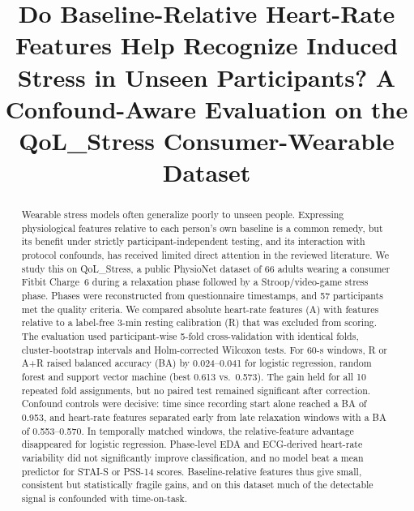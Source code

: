 \documentclass[conference]{IEEEtran}
\begin{document}
\title{Do Baseline-Relative Heart-Rate Features Help Recognize Induced Stress in Unseen Participants? A Confound-Aware Evaluation on the QoL\_Stress Consumer-Wearable Dataset}

\author{
}

\maketitle

\begin{abstract}
Wearable stress models often generalize poorly to unseen people. Expressing physiological features relative to each person's own baseline is a common remedy, but its benefit under strictly participant-independent testing, and its interaction with protocol confounds, has received limited direct attention in the reviewed literature. We study this on QoL\_Stress, a public PhysioNet dataset of 66 adults wearing a consumer Fitbit Charge~6 during a relaxation phase followed by a Stroop/video-game stress phase. Phases were reconstructed from questionnaire timestamps, and 57 participants met the quality criteria. We compared absolute heart-rate features (A) with features relative to a label-free 3-min resting calibration (R) that was excluded from scoring. The evaluation used participant-wise 5-fold cross-validation with identical folds, cluster-bootstrap intervals and Holm-corrected Wilcoxon tests. For 60-s windows, R or A+R raised balanced accuracy (BA) by 0.024--0.041 for logistic regression, random forest and support vector machine (best 0.613 vs.\ 0.573). The gain held for all 10 repeated fold assignments, but no paired test remained significant after correction. Confound controls were decisive: time since recording start alone reached a BA of 0.953, and heart-rate features separated early from late relaxation windows with a BA of 0.553--0.570. In temporally matched windows, the relative-feature advantage disappeared for logistic regression. Phase-level EDA and ECG-derived heart-rate variability did not significantly improve classification, and no model beat a mean predictor for STAI-S or PSS-14 scores. Baseline-relative features thus give small, consistent but statistically fragile gains, and on this dataset much of the detectable signal is confounded with time-on-task.
\end{abstract}
\end{document}
